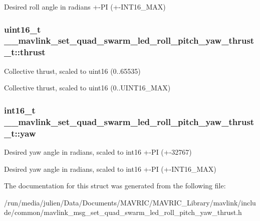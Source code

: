 Desired roll angle in radians +-\/\+P\+I (+-\/\+I\+N\+T16\+\_\+\+M\+A\+X) \hypertarget{struct____mavlink__set__quad__swarm__led__roll__pitch__yaw__thrust__t_a40bcd2646381b83473b10aad2037cfca}{
\subsubsection[{thrust}]{\setlength{\rightskip}{0pt plus 5cm}uint16\+\_\+t \+\_\+\+\_\+mavlink\+\_\+set\+\_\+quad\+\_\+swarm\+\_\+led\+\_\+roll\+\_\+pitch\+\_\+yaw\+\_\+thrust\+\_\+t\+::thrust}}\label{struct____mavlink__set__quad__swarm__led__roll__pitch__yaw__thrust__t_a40bcd2646381b83473b10aad2037cfca}


Collective thrust, scaled to uint16 (0..65535) 

Collective thrust, scaled to uint16 (0..U\+I\+N\+T16\+\_\+\+M\+A\+X) \hypertarget{struct____mavlink__set__quad__swarm__led__roll__pitch__yaw__thrust__t_af47361a27fa441a864a6dfe0358af88d}{
\subsubsection[{yaw}]{\setlength{\rightskip}{0pt plus 5cm}int16\+\_\+t \+\_\+\+\_\+mavlink\+\_\+set\+\_\+quad\+\_\+swarm\+\_\+led\+\_\+roll\+\_\+pitch\+\_\+yaw\+\_\+thrust\+\_\+t\+::yaw}}\label{struct____mavlink__set__quad__swarm__led__roll__pitch__yaw__thrust__t_af47361a27fa441a864a6dfe0358af88d}


Desired yaw angle in radians, scaled to int16 +-\/\+P\+I (+-\/32767) 

Desired yaw angle in radians, scaled to int16 +-\/\+P\+I (+-\/\+I\+N\+T16\+\_\+\+M\+A\+X) 

The documentation for this struct was generated from the following file\+:\begin{DoxyCompactItemize}
\item 
/run/media/julien/\+Data/\+Documents/\+M\+A\+V\+R\+I\+C/\+M\+A\+V\+R\+I\+C\+\_\+\+Library/mavlink/include/common/mavlink\+\_\+msg\+\_\+set\+\_\+quad\+\_\+swarm\+\_\+led\+\_\+roll\+\_\+pitch\+\_\+yaw\+\_\+thrust.\+h\end{DoxyCompactItemize}
